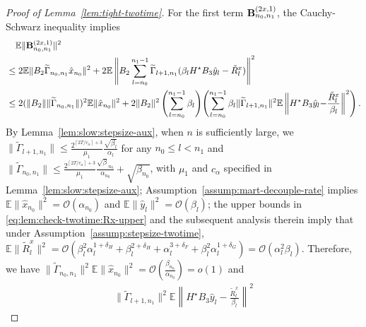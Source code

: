 \documentclass[11pt]{article}
\theoremstyle{plain}
\theoremstyle{definition}
\def\Hsmooth{{\delta_H}}
\def\Fsmooth{{\delta_F}}
\def\Gsmooth{{\delta_G}}
\def\OM{{\mathcal O}}
\def\EB{{\mathbb E}}
\newcommand{\xhat}{{\hat{x}}}
\newcommand{\yhat}{{\hat{y}}}
\newcommand{\ssum}[3]{\sum\limits_{{#1}={#2}}^{#3}}
\def\bfB{{\bf B}}
\begin{document}
\begin{appendix}
\begin{proof}[Proof of Lemma~\ref{lem:tight-twotime}]
    For the first term $\bfB^{(2x,1)}_{n_0,n_1}$, the Cauchy-Schwarz inequality implies
    \begin{align*}
        & \quad \EB \| \bfB^{(2x,1)}_{n_0,n_1} \|^2 \\
        & \le 2  \EB \| B_2 \widetilde{\Gamma}_{n_0, n_1} \xhat_{n_0} \|^2 + 2 \EB \left\| B_2 \ssum{l}{n_0}{n_1-1} \widetilde{\Gamma}_{l+1, n_1} (\beta_{l} H^\star B_3 \yhat_{l} - \tilde{R}^x_{l} ) \right\|^2 \\
        & \le 2 (\| B_2 \| \|\widetilde{\Gamma}_{n_0, n_1} \|)^2 \EB \| \xhat_{n_0} \|^2 + 2 \| B_2 \|^2 \left( \ssum{l}{n_0}{n_1-1} \beta_{l} \right) \!
        \left( \ssum{l}{n_0}{n_1-1} \beta_{l} \| \widetilde{\Gamma}_{l+1, n_1} \|^2  \EB \left\| H^\star B_3 \yhat_{l} {-} \frac{\tilde{R}^x_{l}}{\beta_{l}}  \right\|^2
        \right).
    \end{align*}
    By Lemma~\ref{lem:slow:stepsize-aux}, 
    when $n$ is sufficiently large, we $\| \widetilde{\Gamma}_{l+1,n_1} \| \le \frac{ 2^{ \left\lceil 2T/c_\alpha \right\rceil + 3} }{\mu_1} \frac{ \sqrt{\beta_{l}} }{ \alpha_{l} } $ for any $n_0 \le l < n_1$ and $\| \widetilde{\Gamma}_{n_0, n_1} \| \le \frac{ 2^{ \left\lceil 2T/c_\alpha \right\rceil + 3} }{\mu_1} \frac{ \sqrt{\beta}_{n_0} }{ \alpha_{n_0} } + \sqrt{\beta_{n_0}} $, with $\mu_1$ and $c_\alpha$ specified in Lemma~\ref{lem:slow:stepsize-aux};
    Assumption~\ref{assump:mart-decouple-rate} implies $\EB \| \xhat_{n_0} \|^2 = \OM(\alpha_{n_0})$ and $\EB \| \yhat_{l} \|^2 = \OM (\beta_{l})$;
    the upper bounds in \eqref{eq:lem:check-twotime:Rx-upper} and the subsequent analysis therein imply that under Assumption~\ref{assump:stepsize-twotime},
    $\EB \| \tilde{R}^x_{l} \|^2 = \OM( \beta_{l}^2 \alpha_{l}^{1+\Hsmooth} + \beta_{l}^{2+\Hsmooth} + \alpha_{l}^{3+\Fsmooth} + \beta_{l}^2 \alpha_{l}^{1+\Gsmooth} ) = \OM(\alpha_{l}^2 \beta_{l})$.
    Therefore, we have $\|\widetilde{\Gamma}_{n_0, n_1} \|^2 \EB \| \xhat_{n_0} \|^2 = \OM \left( \frac{\beta_{n_0} }{\alpha_{n_0}} \right) = o(1)$ and
    \begin{align*}
        \|\widetilde{\Gamma}_{l+1, n_1} \|^2 \EB \left\| H^\star B_3 \yhat_{l} - \frac{ \tilde{R}^x_{l} }{\beta_{l}} \right\|^2

\end{align*}
\end{proof}
\end{appendix}
\end{document}
